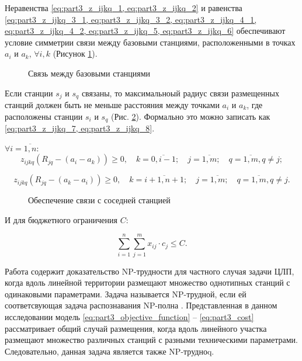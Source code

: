 Неравенства \cref{eq:part3_z_ijkq_1, eq:part3_z_ijkq_2} и равенства \cref{eq:part3_z_ijkq_3_1, eq:part3_z_ijkq_3_2, eq:part3_z_ijkq_4_1, eq:part3_z_ijkq_4_2, eq:part3_z_ijkq_5, eq:part3_z_ijkq_6} обеспечивают условие симметрии связи между базовыми станциями, расположенными в точках $ a_i $ и $ a_k $, $\forall i, k $ (Рисунок \cref{fig:part3_station_link}).

\begin{figure}[ht]
  \caption{Связь между базовыми станциями}\label{fig:part3_station_link}
\end{figure}

Если станции $ s_j $ и $ s_q $ связаны, то максимальноый радиус связи размещенных станций должен быть не меньше расстояния между точками $ a_i $ и $ a_k $, где расположены станции $ s_i $ и $ s_q $ (Рис. \cref{fig:part3_station_link_between_points}). Формально это можно записать как \cref{eq:part3_z_ijkq_7, eq:part3_z_ijkq_8}.

 $\forall i= \overline{1,n}$:
\begin{equation}
  \label{eq:part3_z_ijkq_7}
  z_{ijkq}(R_{jq}-(a_i-a_k ))\geq 0, \quad k=\overline{0,i-1}; \quad j=\overline{1,m}; \quad q= \overline{1,m}, q \neq j; 
\end{equation}

\begin{equation}
  \label{eq:part3_z_ijkq_8}
  z_{ijkq} (R_{jq}-(a_k-a_i )) \geq 0, \quad k=\overline{i+1,n+1}; \quad j=\overline{1,m}; \quad q= \overline{1,m}, q \neq j.
\end{equation}

\begin{figure}[ht]
  \caption{Обеспечение связи с соседней станцией}\label{fig:part3_station_link_between_points}
\end{figure}

И для бюджетного ограничения $C$:

\begin{equation}
  \label{eq:part3_cost}
  \sum\limits_{i=1}^n \sum\limits_{j=1}^m x_{ij} \cdot c_j \leq C.
\end{equation}

Работа \cite{Ivanov2018} содержит доказательство NP-трудности для частного случая задачи ЦЛП, когда вдоль линейной территории размещают множество однотипных станций с одинаковыми параметрами. Задача называется NP-трудной, если ей соответсвующая задача распознавания NP-полна \cite{Pershin2013}.  Представленная в данном исследовании модель \cref{eq:part3_objective_function} -- \cref{eq:part3_cost} рассматривает общий случай размещения, когда вдоль линейного участка размещают множество различных станций с разными техническими параметрами. Следовательно, данная задача является также NP-трудноq.

